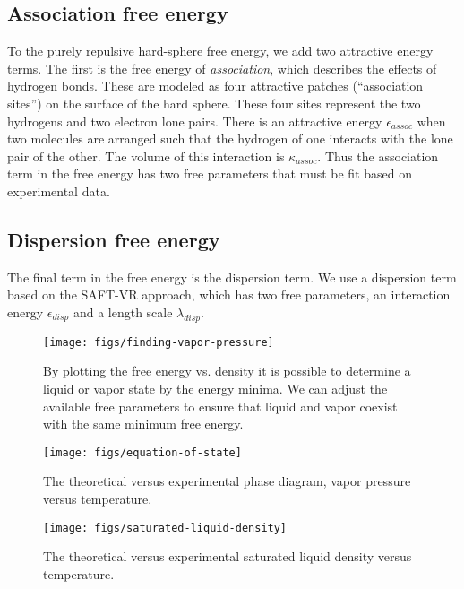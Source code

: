 \documentclass[letterpaper,twocolumn,amsmath,amssymb,prb]{revtex4}
\begin{document}
\subsection{Association free energy}
To the purely repulsive hard-sphere free energy, we add two attractive
energy terms.  The first is the free energy of \emph{association},
which describes the effects of hydrogen bonds.  These are modeled as
four attractive patches (``association sites'') on the surface of the
hard sphere.  These four sites represent the two hydrogens and two
electron lone pairs.  There is an attractive energy
$\epsilon_\textit{assoc}$ when two molecules are arranged such that
the hydrogen of one interacts with the lone pair of the other.  The
volume of this interaction is $\kappa_\textit{assoc}$.  Thus the
association term in the free energy has two free parameters that must
be fit based on experimental data.

\subsection{Dispersion free energy}
The final term in the free energy is the dispersion term.  We use a
dispersion term based on the SAFT-VR approach, which has two free
parameters, an interaction energy $\epsilon_\textit{disp}$ and a
length scale $\lambda_\textit{disp}$.

\begin{figure}
\begin{center}
\texttt{[image: figs/finding-vapor-pressure]}
\end{center}
\caption{By plotting the free energy vs. density it is possible to
  determine a liquid or vapor state by the energy minima.  We can adjust the
  available free parameters to ensure that liquid and vapor coexist with
  the same minimum free energy.  }
\label{fig:homogeneous}
\end{figure}


\begin{figure}
\begin{center}
\texttt{[image: figs/equation-of-state]}
\end{center}
\caption{The theoretical versus experimental phase diagram, vapor
  pressure versus temperature.  }
\label{fig:equation-of-state}
\end{figure}


\begin{figure}
\begin{center}
\texttt{[image: figs/saturated-liquid-density]}
\end{center}
\caption{The theoretical versus experimental saturated liquid density
  versus temperature.  }
\label{fig:saturated-liquid-density}
\end{figure}
\end{document}
